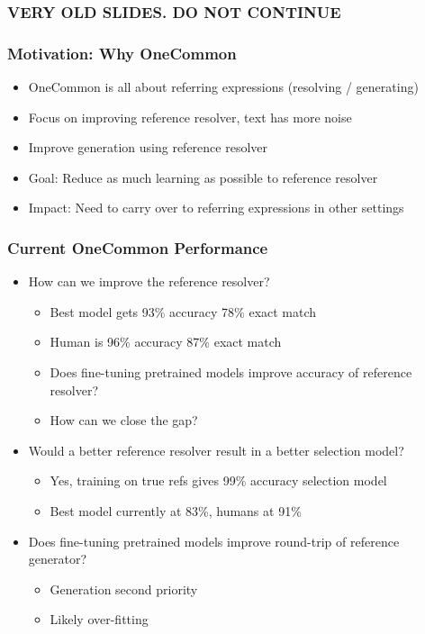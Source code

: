 \documentclass{beamer}
\begin{document}
\begin{frame}
\frametitle{VERY OLD SLIDES. DO NOT CONTINUE}
\end{frame}

\begin{frame}
\frametitle{Motivation: Why OneCommon}
\begin{itemize}
\item OneCommon is all about referring expressions (resolving / generating)
\item Focus on improving reference resolver, text has more noise
\item Improve generation using reference resolver
\item Goal: Reduce as much learning as possible to reference resolver
\item Impact: Need to carry over to referring expressions in other settings
\end{itemize}
\end{frame}

\begin{frame}
\frametitle{Current OneCommon Performance}
\begin{itemize}
\item How can we improve the reference resolver?
    \begin{itemize}
    \item Best model gets 93\% accuracy 78\% exact match
    \item Human is 96\% accuracy 87\% exact match
    \item Does fine-tuning pretrained models improve accuracy of reference resolver?
    \item How can we close the gap?
    \end{itemize}
\item Would a better reference resolver result in a better selection model?
    \begin{itemize}
    \item Yes, training on true refs gives 99\% accuracy selection model
    \item Best model currently at 83\%, humans at 91\%
    \end{itemize}
\item Does fine-tuning pretrained models improve round-trip of reference generator?
    \begin{itemize}
    \item Generation second priority
    \item Likely over-fitting
    \end{itemize}
\end{itemize}
\end{frame}
\end{document}

